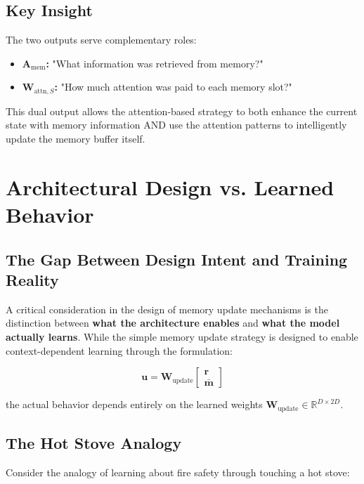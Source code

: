 \documentclass{article}
\begin{document}
\subsection{Key Insight}

The two outputs serve complementary roles:
\begin{itemize}
\item \textbf{$\mathbf{A}_{\text{mem}}$:} "What information was retrieved from memory?"
\item \textbf{$\mathbf{W}_{\text{attn},S}$:} "How much attention was paid to each memory slot?"
\end{itemize}

This dual output allows the attention-based strategy to both enhance the current state with memory information AND use the attention patterns to intelligently update the memory buffer itself.

\section{Architectural Design vs. Learned Behavior}

\subsection{The Gap Between Design Intent and Training Reality}

A critical consideration in the design of memory update mechanisms is the distinction between \textbf{what the architecture enables} and \textbf{what the model actually learns}. While the simple memory update strategy is designed to enable context-dependent learning through the formulation:

\begin{equation}
\mathbf{u} = \mathbf{W}_{\text{update}} \begin{bmatrix} \mathbf{r} \\ \bar{\mathbf{m}} \end{bmatrix}
\end{equation}

the actual behavior depends entirely on the learned weights $\mathbf{W}_{\text{update}} \in \mathbb{R}^{D \times 2D}$.

\subsection{The Hot Stove Analogy}

Consider the analogy of learning about fire safety through touching a hot stove:
\end{document}
